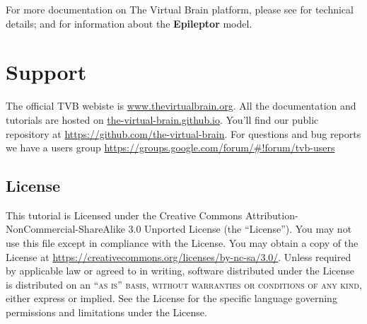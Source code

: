 \documentclass{tufte-handout}
\begin{document}
For more documentation on The Virtual Brain platform, please see \citet{Sanz-
Leon_2013, Woodman_2014} for technical details; and \citet{Jirsa_2014} for
information about the \textbf{Epileptor} model.


\section{Support}\label{sec:support}

The official TVB webiste is \url{www.thevirtualbrain.org}.  
All the documentation and tutorials are hosted on \url{the-virtual-brain.github.io}.
You'll find our public  repository at \url{https://github.com/the-virtual-brain}. 
For questions and bug reports we have a users group \url{https://groups.google.com/forum/#!forum/tvb-users}

\subsection{License}

This tutorial is Licensed under the Creative Commons Attribution-NonCommercial-ShareAlike 3.0 Unported
License (the ``License''). You may not use this file except in compliance with
the License. You may obtain a copy of the License at \url{https://creativecommons.org/licenses/by-nc-sa/3.0/}. 
Unless required by applicable law or agreed to in writing, software distributed under the License
is distributed on an \textsc{``as is'' basis, without warranties or conditions
of any kind}, either express or implied. See the License for the specific
language governing permissions and limitations under the License.



\end{document}
